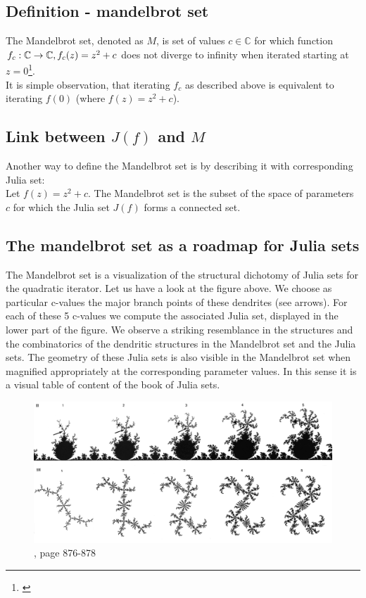 \documentclass{article}
\begin{document}
\subsection{Definition - mandelbrot set}
The Mandelbrot set, denoted as $M$, is set of values $c\in\mathbb{C}$ for which function $f_{c}:\mathbb{C} \rightarrow \mathbb{C},\\f_{c}(z)=z^{2}+c$ does not diverge to infinity when iterated starting at $z=0$\footnote{\cite{Weissteina}}.
\\[2\baselineskip]
It is simple observation, that iterating $f_{c}$ as described above is equivalent to iterating $f(0)$ (where $f(z)=z^{2}+c$).

\pagebreak
\subsection{\texorpdfstring{Link between $J(f)$ and $M$}{Link between J(f) and M}} \label{JandM}
Another way to define the Mandelbrot set is by describing it with corresponding Julia set:\\
Let $f(z)=z^{2}+c$. The Mandelbrot set is the subset of the space of parameters $c$ for which the Julia set $J(f)$ forms a connected set.

\subsection{The mandelbrot set as a roadmap for Julia sets}
The Mandelbrot set is a visualization of the structural dichotomy of Julia sets for the quadratic iterator. Let us have a look at the figure above.	 We choose as particular c-values the major branch points of these dendrites (see arrows). For each of these 5 c-values we compute the associated Julia set, displayed in the lower part of the figure. We observe a striking resemblance in the structures and the combinatorics of the dendritic structures in the Mandelbrot set and the Julia sets. The geometry of these Julia sets is also visible in the Mandelbrot set when magnified appropriately at the corresponding parameter values. In this sense it is a visual table of content of the book of Julia sets.
\begin{figure}[H]
	\includegraphics[width=\linewidth]{Utils/article_dependencies/Picture_for_5_3.png}
	\caption{\footnotesize \cite{Heinz-OttoPeitgen2004}, page 876-878}
\end{figure}
\end{document}
